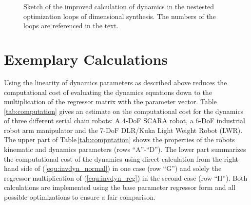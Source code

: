 \documentclass{svproc}
\begin{document}
\begin{figure}[tb]
    
    \caption{Sketch of the improved calculation of dynamics in the nestested optimization loops of dimensional synthesis. The numbers of the loops are referenced in the text.}
    \label{fig:dimsynth_dyn_plin}
\end{figure} 




\section{Exemplary Calculations}
\label{sec:Example}

Using the linearity of dynamics parameters as described above reduces the computational cost of evaluating the dynamics equations down to the multiplication of the regressor matrix with the parameter vector.
Table\,\ref{tab:computation} gives an estimate on the computational cost for the dynamics of three different serial chain robots: A 4-DoF SCARA robot, a 6-DoF industrial robot arm manipulator and the 7-DoF DLR/Kuka Light Weight Robot (LWR).
The upper part of Table\,\ref{tab:computation} shows the properties of the robots kinematic and dynamics parameters (rows ``A''-``D'').
The lower part summarizes the computational cost of the dynamics using direct calculation from the right-hand side of (\ref{equ:invdyn_normal}) in one case (row ``G'') and solely the regressor multiplication of (\ref{equ:invdyn_reg}) in the second case (row ``H'').
Both calculations are implemented using the base parameter regressor form and all possible optimizations to ensure a fair comparison.
\end{document}
